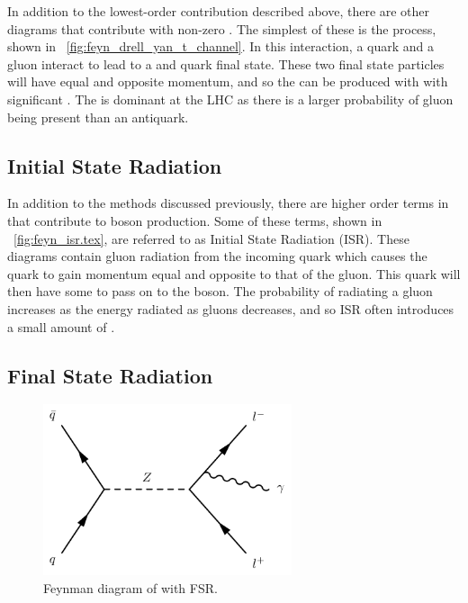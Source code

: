 In addition to the lowest-order contribution described above, there are other
diagrams that contribute with non-zero \pt. The simplest of these is the
\tChannel process, shown in \FIG~\ref{fig:feyn_drell_yan_t_channel}. In this
interaction, a quark and a gluon interact to lead to a \Z and quark final
state. These two final state particles will have equal and opposite momentum,
and so the \Z can be produced with with significant \pt. The \tChannel is
dominant at the LHC as there is a larger probability of gluon being present
than an antiquark.



\subsection{Initial State Radiation}

In addition to the methods discussed previously, there are higher order terms
in \alphastrong that contribute to \Z boson production. Some of these terms,
shown in \FIG~\ref{fig:feyn_isr.tex}, are referred to as Initial State
Radiation (ISR). These diagrams contain gluon radiation from the incoming
quark which causes the quark to gain momentum equal and opposite to that of the
gluon. This quark will then have some \pt to pass on to the \Z boson. The
probability of radiating a gluon increases as the energy radiated as gluons
decreases, and so ISR often introduces a small amount of \bosonpt.


\subsection{Final State Radiation}
\label{sec:electron_dressing}

\begin{figure}[!htb]
    \centering
    \includegraphics[width=0.65\textwidth]{figures/fsr.pdf}
    \caption{
        Feynman diagram of \Ztoll with FSR.
    }
    \label{fig:fsr_diagram}
\end{figure}


